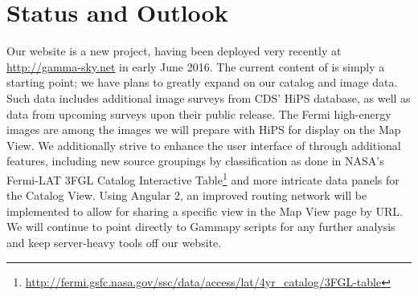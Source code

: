 \section{Status and Outlook}


Our website is a new project, having been deployed very recently at \url{http://gamma-sky.net} in early June 2016. The current content of \gammasky is simply a starting point; we have plans to greatly expand on our catalog and image data. Such data includes additional image surveys from CDS' HiPS database, as well as data from upcoming surveys upon their public release. The Fermi high-energy images are among the images we will prepare with HiPS for display on the Map View. We additionally strive to enhance the user interface of \gammasky through additional features, including new source groupings by classification as done in NASA's Fermi-LAT 3FGL Catalog Interactive Table\footnote[6]{\url{http://fermi.gsfc.nasa.gov/ssc/data/access/lat/4yr_catalog/3FGL-table}} and more intricate data panels for the Catalog View. Using Angular 2, an improved routing network will be implemented  to allow for sharing a specific view in the Map View page by URL. We will continue to point directly to Gammapy scripts for any further analysis and keep server-heavy tools off our website.
